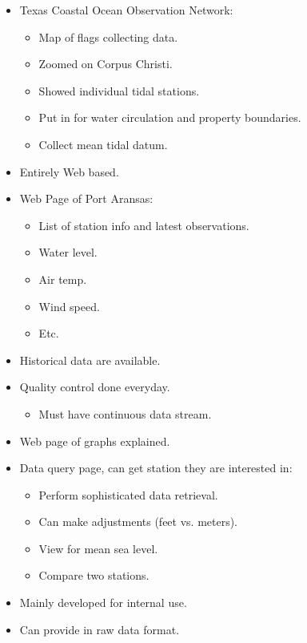 \begin{itemize}
\item Texas Coastal Ocean Observation Network:
\begin{itemize}
\item Map of flags collecting data.
\item Zoomed on Corpus Christi.
\item Showed individual tidal stations.
\item Put in for water circulation and property boundaries. 
\item Collect mean tidal datum.
\end{itemize}

\item Entirely Web based.

\item Web Page of Port Aransas:
\begin{itemize}
\item List of station info and latest observations.
\item Water level.
\item Air temp.
\item Wind speed.
\item Etc.
\end{itemize}

\item Historical data are available.

\item Quality control done everyday.
\begin{itemize}
\item Must have continuous data stream.
\end{itemize}

\item Web page of graphs explained. 

\item Data query page, can get station they are interested in:
\begin{itemize}
\item Perform sophisticated data retrieval.
\item Can make adjustments (feet vs. meters).
\item View for mean sea level.
\item Compare two stations.
\end{itemize}


\item Mainly developed for internal use.

\item Can provide in raw data format.


\end{itemize}

